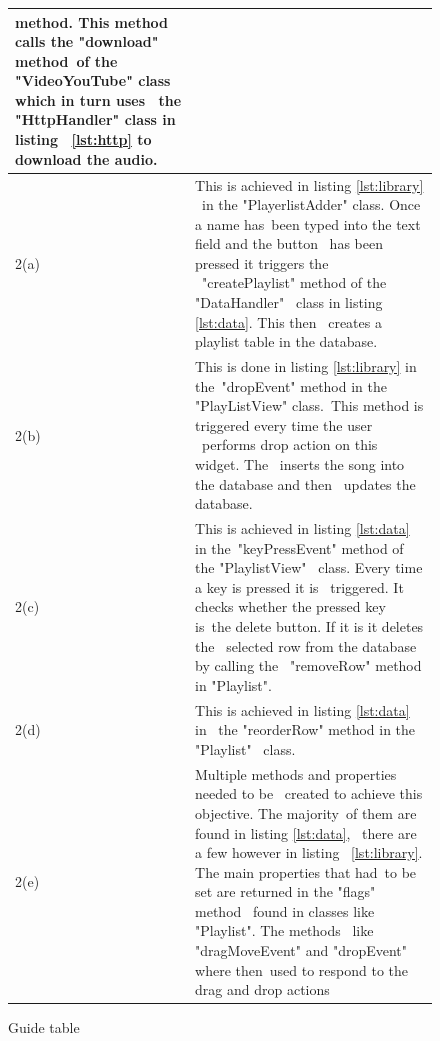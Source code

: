 \documentclass{article}
\begin{document}
\begin{figure}[H]
\begin{tabular} {| p{2cm} | p{10cm} |}
                             method. This method calls the "download" method\
                             of the "VideoYouTube" class which in turn uses \
                             the "HttpHandler" class in listing             \
                             \ref{lst:http} to download the audio.          \\ \hline
        2(a)                &This is achieved in listing \ref{lst:library}  \
                             in the "PlayerlistAdder" class. Once a name has\
                             been typed into the text field and the button  \
                             has been pressed it triggers the               \
                             "createPlaylist" method of the "DataHandler"   \
                             class in listing \ref{lst:data}. This then     \
                             creates a playlist table in the database.      \\ \hline
        2(b)                &This is done in listing \ref{lst:library} in the\
                             "dropEvent" method in the "PlayListView" class.\
                             This method is triggered every time the user    \
                             performs drop action on this widget. The       \
                             inserts the song into the database and then    \
                             updates the database.                          \\ \hline
        2(c)                &This is achieved in listing \ref{lst:data} in the\
                             "keyPressEvent" method of the "PlaylistView"   \
                             class. Every time a key is pressed it is        \
                             triggered. It checks whether the pressed key is\
                             the delete button. If it is it deletes the      \
                             selected row from the database by calling the  \
                             "removeRow" method in "Playlist".              \\ \hline
        2(d)                &This is achieved in listing \ref{lst:data} in  \
                             the "reorderRow" method in the "Playlist"      \
                             class.                                         \\ \hline
        2(e)                &Multiple methods and properties needed to be   \
                             created to achieve this objective. The majority\
                             of them are found in listing \ref{lst:data},   \
                             there are a few however in listing             \
                             \ref{lst:library}. The main properties that had\
                             to be set are returned in the "flags" method   \
                             found in classes like "Playlist". The methods  \
                             like "dragMoveEvent" and "dropEvent" where then\
                             used to respond to the drag and drop actions   \\ \hline
    \end{tabular}
    \caption{Guide table} \label{fig:guideTable}
\end{figure}
\end{document}
